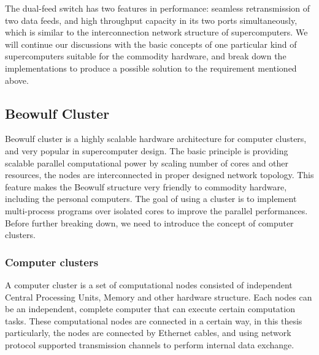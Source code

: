 \documentclass[11pt,openright,a4paper]{report}
\begin{document}
The dual-feed switch has two features in performance: seamless retransmission of two data feeds, and high throughput capacity in its two ports simultaneously, which is similar to the interconnection network structure of supercomputers. We will continue our discussions with the basic concepts of one particular kind of supercomputers suitable for the commodity hardware, and break down the implementations to produce a possible solution to the requirement mentioned above.\\
\subsection{Beowulf Cluster}
Beowulf cluster is a highly scalable hardware architecture for computer clusters, and very popular in supercomputer design\cite{behrooz2005computer}. The basic principle is providing scalable parallel computational power by scaling number of cores and other resources, the nodes are interconnected in proper designed network topology. This feature makes the Beowulf structure very friendly to commodity hardware, including the personal computers\cite{sterling2002beowulf}. The goal of using a cluster is to implement multi-process programs over isolated cores to improve the parallel performances. Before further breaking down, we need to introduce the concept of computer clusters.\\
\subsubsection{Computer clusters}
A computer cluster is a set of computational nodes consisted of independent Central Processing Units, Memory and other hardware structure\cite{vrenios2002linux}. Each nodes can be an independent, complete computer that can execute certain computation tasks\cite{sterling2002beowulf}. These computational nodes are connected in a certain way, in this thesis particularly, the nodes are connected by Ethernet cables, and using network protocol supported transmission channels to perform internal data exchange. \\
\end{document}
